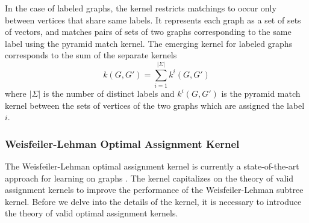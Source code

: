 \documentclass[twoside,11pt]{article}
\begin{document}
In the case of labeled graphs, the kernel restricts matchings to occur only between vertices that share same labels.
It represents each graph as a set of sets of vectors, and matches pairs of sets of two graphs corresponding to the same label using the pyramid match kernel.
The emerging kernel for labeled graphs corresponds to the sum of the separate kernels
\begin{equation}
    k(G, G') = \sum_{i=1}^{|\Sigma|} k^i(G,G')
\end{equation}
where $|\Sigma|$ is the number of distinct labels and $k^i(G,G')$ is the pyramid match kernel between the sets of vertices of the two graphs which are assigned the label $i$.

\subsubsection{Weisfeiler-Lehman Optimal Assignment Kernel}
The Weisfeiler-Lehman optimal assignment kernel is currently a state-of-the-art approach for learning on graphs .
The kernel capitalizes on the theory of valid assignment kernels to improve the performance of the Weisfeiler-Lehman subtree kernel.
Before we delve into the details of the kernel, it is necessary to introduce the theory of valid optimal assignment kernels.
\end{document}
